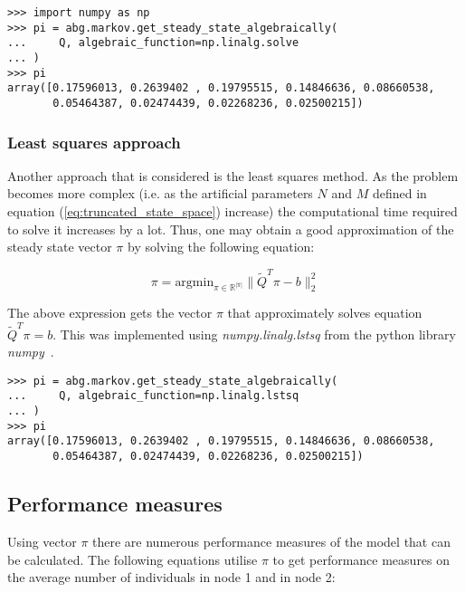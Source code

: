 \begin{lstlisting}[style=pystyle]
>>> import numpy as np
>>> pi = abg.markov.get_steady_state_algebraically(
...     Q, algebraic_function=np.linalg.solve
... )
>>> pi
array([0.17596013, 0.2639402 , 0.19795515, 0.14846636, 0.08660538,
       0.05464387, 0.02474439, 0.02268236, 0.02500215])

\end{lstlisting}


\subsubsection{Least squares approach}

Another approach that is considered is the least squares method.
As the problem becomes more complex (i.e. as the artificial parameters \(N\)
and \(M\) defined in equation (\ref{eq:truncated_state_space}) increase)
the computational time required to solve it increases by a lot.
Thus, one may obtain a good approximation of the steady state vector \( \pi \)
by solving the following equation:

\begin{equation}
    \pi = \text{argmin}_{\pi \in \mathbb{R}^{|\pi|}}\|\tilde Q^T \pi - b\|_2^2
\end{equation}

The above expression gets the vector \( \pi \) that approximately solves
equation \(\tilde Q^T \pi = b\).
This was implemented using \textit{numpy.linalg.lstsq} from the python
library \textit{numpy}~\cite{2020NumPy-Array}.

\begin{lstlisting}[style=pystyle]
>>> pi = abg.markov.get_steady_state_algebraically(
...     Q, algebraic_function=np.linalg.lstsq
... )
>>> pi
array([0.17596013, 0.2639402 , 0.19795515, 0.14846636, 0.08660538,
       0.05464387, 0.02474439, 0.02268236, 0.02500215])

\end{lstlisting}





\subsection{Performance measures}
Using vector \(\pi\) there are numerous performance measures of the model that
can be calculated.
The following equations utilise \(\pi\) to get performance measures on the
average number of individuals in node 1 and in node 2:

